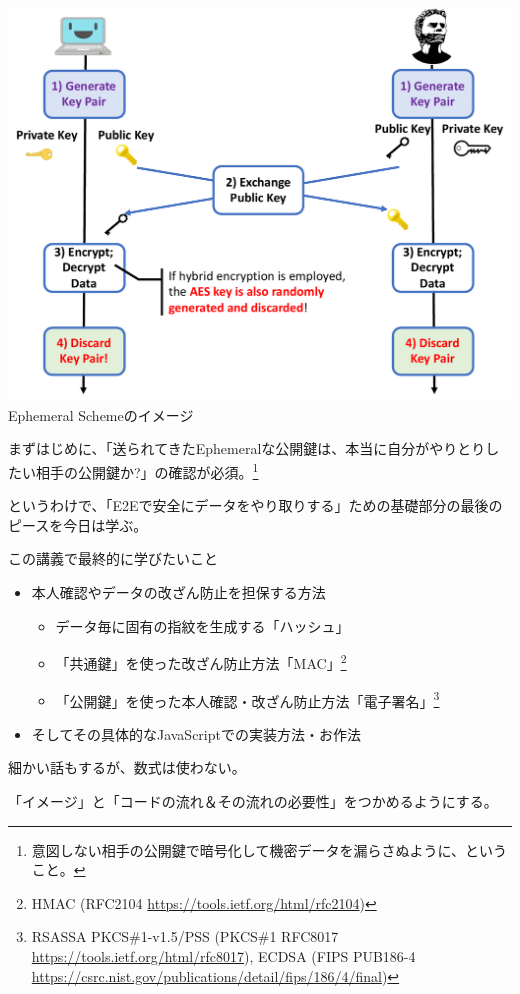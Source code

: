 \documentclass[12pt,dvipdfmx]{beamer}
\begin{document}
\begin{frame}
\small 
\begin{center}
\includegraphics[width=0.7\linewidth]{Figs/ephemeral-scheme-flow01.pdf}\\
Ephemeral Schemeのイメージ
\end{center}
\vspace{-1ex}

まずはじめに、\alert{「送られてきたEphemeralな公開鍵は、本当に自分がやりとりしたい相手の公開鍵か?」の確認}が必須。\footnote[frame]{\scriptsize 意図しない相手の公開鍵で暗号化して機密データを漏らさぬように、ということ。}
\end{frame}

\begin{frame}

というわけで、「E2Eで安全にデータをやり取りする」ための基礎部分の最後のピースを今日は学ぶ。

\begin{block}{\small この講義で最終的に学びたいこと}
\begin{itemize}
\item 本人確認やデータの改ざん防止を担保する方法
\begin{itemize}
 \item データ毎に固有の指紋を生成する「\alert{ハッシュ}」
 \item 「共通鍵」を使った改ざん防止方法「\alert{MAC}」\footnote[frame]{\scriptsize HMAC (RFC2104 \url{https://tools.ietf.org/html/rfc2104})}
 \item 「公開鍵」を使った本人確認・改ざん防止方法「\alert{電子署名}」\footnote[frame]{\scriptsize RSASSA PKCS\#1-v1.5/PSS (PKCS\#1 RFC8017 \url{https://tools.ietf.org/html/rfc8017}), ECDSA (FIPS PUB186-4 \url{https://csrc.nist.gov/publications/detail/fips/186/4/final})}
\end{itemize}
\item そしてその具体的なJavaScriptでの実装方法・お作法
\end{itemize}
\end{block}

細かい話もするが、数式は使わない。

「イメージ」と「コードの流れ＆その流れの必要性」をつかめるようにする。
\end{frame}
\end{document}
